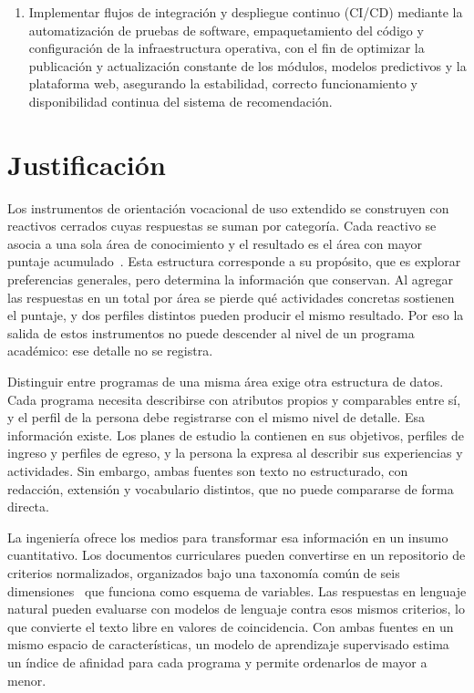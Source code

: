 \begin{enumerate}
    \item Implementar flujos de integración y despliegue continuo (CI/CD) mediante la automatización de pruebas de software, empaquetamiento del código y configuración de la infraestructura operativa, con el fin de optimizar la publicación y actualización constante de los módulos, modelos predictivos y la plataforma web, asegurando la estabilidad, correcto funcionamiento y disponibilidad continua del sistema de recomendación.
\end{enumerate}

\section{Justificación}
Los instrumentos de orientación vocacional de uso extendido se construyen con reactivos cerrados cuyas respuestas se suman por categoría. Cada reactivo se asocia a una sola área de conocimiento y el resultado es el área con mayor puntaje acumulado~\cite{GarciaMartinez2021,Vargas2026}. Esta estructura corresponde a su propósito, que es explorar preferencias generales, pero determina la información que conservan. Al agregar las respuestas en un total por área se pierde qué actividades concretas sostienen el puntaje, y dos perfiles distintos pueden producir el mismo resultado. Por eso la salida de estos instrumentos no puede descender al nivel de un programa académico: ese detalle no se registra.

Distinguir entre programas de una misma área exige otra estructura de datos. Cada programa necesita describirse con atributos propios y comparables entre sí, y el perfil de la persona debe registrarse con el mismo nivel de detalle. Esa información existe. Los planes de estudio la contienen en sus objetivos, perfiles de ingreso y perfiles de egreso, y la persona la expresa al describir sus experiencias y actividades. Sin embargo, ambas fuentes son texto no estructurado, con redacción, extensión y vocabulario distintos, que no puede compararse de forma directa.

La ingeniería ofrece los medios para transformar esa información en un insumo cuantitativo. Los documentos curriculares pueden convertirse en un repositorio de criterios normalizados, organizados bajo una taxonomía común de seis dimensiones~\cite{Holland1997} que funciona como esquema de variables. Las respuestas en lenguaje natural pueden evaluarse con modelos de lenguaje contra esos mismos criterios, lo que convierte el texto libre en valores de coincidencia. Con ambas fuentes en un mismo espacio de características, un modelo de aprendizaje supervisado estima un índice de afinidad para cada programa y permite ordenarlos de mayor a menor.

